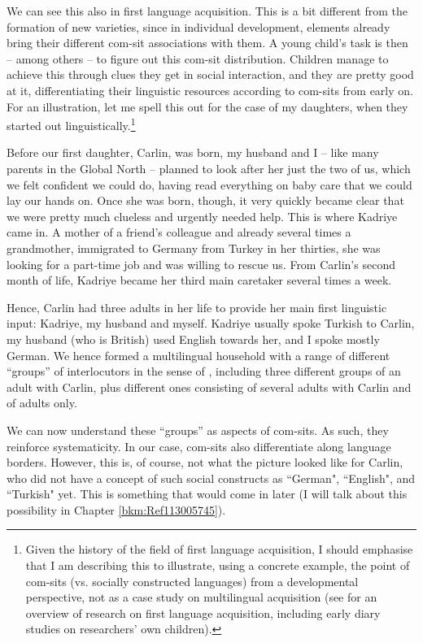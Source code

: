 We can see this also in first language acquisition. This is a bit different from the formation of new varieties, since in individual development, elements already bring their different com-sit associations with them. A young child’s task is then – among others – to figure out this com-sit distribution. Children manage to achieve this through clues they get in social interaction, and they are pretty good at it, differentiating their linguistic resources according to com-sits from early on. For an illustration, let me spell this out for the case of my daughters, when they started out linguistically.\footnote{Given the history of the field of first language acquisition, I should emphasise that I am describing this to illustrate, using a concrete example, the point of com-sits (vs. socially constructed languages) from a developmental perspective, not as a case study on multilingual acquisition (see \citealt{Clark2019} for an overview of research on first language acquisition, including early diary studies on researchers’ own children).}

Before our first daughter, Carlin, was born, my husband and I – like many parents in the Global North – planned to look after her just the two of us, which we felt confident we could do, having read everything on baby care that we could lay our hands on. Once she was born, though, it very quickly became clear that we were pretty much clueless and urgently needed help. This is where Kadriye came in. A mother of a friend’s colleague and already several times a grandmother, immigrated to Germany from Turkey in her thirties, she was looking for a part-time job and was willing to rescue us. From Carlin’s second month of life, Kadriye became her third main caretaker several times a week.

Hence, Carlin had three adults in her life to provide her main first linguistic input: Kadriye, my husband and myself. Kadriye usually spoke Turkish to Carlin, my husband (who is British) used English towards her, and I spoke mostly German. We hence formed a multilingual household with a range of different “groups” of interlocutors in the sense of \citet{LepageTabouretkeller1985}, including three different groups of an adult with Carlin, plus different ones consisting of several adults with Carlin and of adults only.

We can now understand these “groups” as aspects of com-sits. As such, they reinforce systematicity. In our case, com-sits also differentiate along language borders. However, this is, of course, not what the picture looked like for Carlin, who did not have a concept of such social constructs as “German", “English", and “Turkish" yet. This is something that would come in later (I will talk about this possibility in Chapter \ref{bkm:Ref113005745}).

